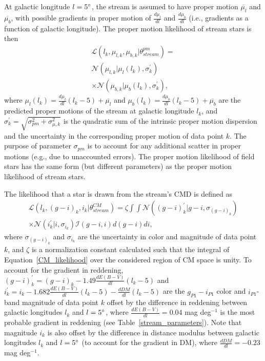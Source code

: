 \documentclass[iop]{emulateapj}
\begin{document}
At galactic longitude $l=5\mbox{$^\circ$}$, the stream is assumed to have proper motion
$\overline{\mu_l}$ and $\overline{\mu_b}$, with possible gradients in proper
motion of $\frac{d\mu_l}{dl}$ and $\frac{d\mu_b}{dl}$ (i.e., gradients as a
function of galactic longitude). The proper motion likelihood of stream stars is
then
\begin{equation}
\begin{split}
\mathcal{L}(l_k,\mu_{l,k},\mu_{b,k}|\theta^{pm}_{stream})= \\
\mathcal{N}(\mu_{l,k}| \mu_l(l_k), \sigma^\prime_k) \\
\times\mathcal{N}(\mu_{b,k}| \mu_b(l_k), \sigma^\prime_k),
\end{split}
\end{equation}
where $\mu_l(l_k)=\frac{d\mu_l}{dl}\left(l_k-5\right) + \overline{\mu_l}$ and
$\mu_b(l_k)=\frac{d\mu_b}{dl}\left(l_k-5\right) + \overline{\mu_b}$ are the
predicted proper motions of the stream at galactic longitude $l_k$, and
$\sigma^\prime_k = \sqrt{\sigma_{pm}^2 + \sigma^2_{\mu,k}}$ is the quadratic sum
of the intrinsic proper motion dispersion and the uncertainty in the
corresponding proper motion of data point $k$. The purpose of parameter
$\sigma_{pm}$ is to account for any additional scatter in proper motions (e.g., 
due to unaccounted errors). The proper motion likelihood of field stars has the
same form (but different parameters) as the proper motion likelihood of stream
stars.

The likelihood that a star is drawn from the stream's CMD is defined as
\begin{equation}
\begin{split}
\mathcal{L}(l_k, (g-i)_k, i_k| \theta^{CM}_{stream})=\zeta \int\int \mathcal{N}((g-i)^\prime_k| g-i, \sigma_{(g-i)_k}) \\
\times \mathcal{N}(i^\prime_k | i, \sigma_{i_k})\mathcal{I}(g-i, i)d(g-i)di,\label{CM_likelihood}
\end{split}
\end{equation}
where
$\sigma_{(g-i)_k}$ and $\sigma_{i_k}$ are the uncertainty in color and magnitude
of data point $k$, and $\zeta$ is a normalization constant calculated such that
the integral of Equation~\ref{CM_likelihood} over the considered region of CM
space is unity. To account for the gradient in reddening,
$(g-i)^\prime_k=(g-i)_k - 1.49\frac{dE(B-V)}{dl}(l_k-5)$ and
$i^\prime_k=i_k - 1.682\frac{dE(B-V)}{dl}(l_k-5) - \frac{dDM}{dl}(l_k-5)$ are
the $g_{P1}-i_{P1}$ color and $i_{P1}$-band magnitude of data point $k$ offset
by the difference in reddening between galactic longitudes $l_k$ and
$l=5\mbox{$^\circ$}$, where $\frac{dE(B-V)}{dl}=0.04$ mag deg$^{-1}$ is the most
probable gradient in reddening (see Table~\ref{stream_parameters}). Note that
magnitude $i_k$ is also offset by the difference in distance modulus between
galactic longitudes $l_k$ and $l=5\mbox{$^\circ$}$ (to account for the gradient in DM), 
where $\frac{dDM}{dl}=-0.23$ mag deg$^{-1}$.
\end{document}
